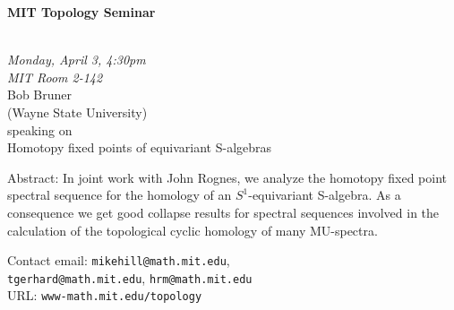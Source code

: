 \documentclass{slides}
\begin{document}
\begin{center}

{\fontsize {54pt}{40pt}\selectfont

\textrm{
{\textbf{MIT Topology Seminar}}}
}\\
\vspace{1cm}
{\large\textrm{\emph{Monday, April 3, 4:30pm\\MIT Room 2-142}}}\\
\vspace{1cm}
\textrm{{\LARGE Bob Bruner  \\[.5cm](Wayne State University)}}\\
\vspace{1cm} %
\textrm{speaking on}\\ %
\vspace{5mm}
\textrm{{\LARGE Homotopy fixed points of equivariant S-algebras}}\\
\end{center}
\vspace{1cm}
{\small
Abstract:  In joint work with John Rognes, we analyze the homotopy fixed
point spectral sequence for the homology of an $S^1$-equivariant S-algebra.
As a consequence we get good collapse results for spectral sequences
involved in the calculation of the topological cyclic homology of many
MU-spectra.

\textrm{Contact email: } \texttt{mikehill@math.mit.edu}, \\
\texttt{tgerhard@math.mit.edu},
\texttt{hrm@math.mit.edu}\\
\textrm{URL: } \texttt{www-math.mit.edu/topology}
}
\end{document}
